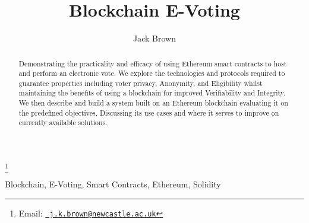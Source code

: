 \documentclass{entcs}
\begin{document}
\begin{frontmatter}

\title{Blockchain E-Voting}
\author{Jack Brown}
\address{School of Computing Science, Newcastle University, UK} 

\thanks{Email:
    \href{mailto:j.k.brown@newcastle.ac.uk} {\texttt{\normalshape
        j.k.brown@newcastle.ac.uk}}}

\begin{abstract} 
Demonstrating the practicality and efficacy of using Ethereum smart contracts to host and perform an electronic vote. We explore the technologies and protocols required to guarantee properties including voter privacy, Anonymity, and Eligibility whilst maintaining the benefits of using a blockchain for improved Verifiability and Integrity. We then describe and build a system built on an Ethereum blockchain evaluating it on the predefined objectives. Discussing its use cases and where it serves to improve on currently available solutions.
\end{abstract}

\begin{keyword}
Blockchain, E-Voting, Smart Contracts, Ethereum, Solidity
\end{keyword}

\end{frontmatter}
\end{document}
